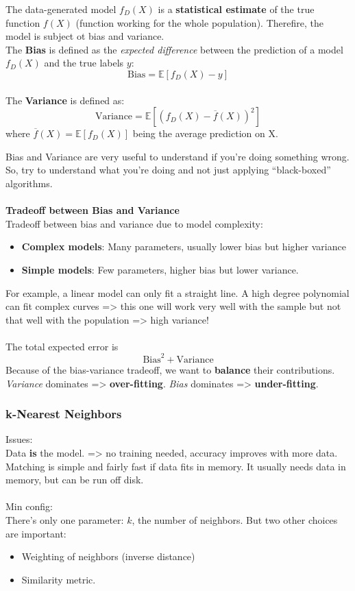 The data-generated model $f_D(X)$ is a \textbf{statistical estimate} of the true function $f(X)$ (function working for the whole population). Therefire, the model is subject ot bias and variance. 
\\
The \textbf{Bias} is defined as the \emph{expected difference} between the prediction of a model $f_D(X)$ and the true labels $y$:
\[
 \textrm{Bias} = \mathbb{E}\left[ f_D(X)-y\right]
\]
\\
The \textbf{Variance} is defined as:
\[
 \textrm{Variance} = \mathbb{E}\left[\left(f_D(X) - \overline{f}(X)\right)^2\right]
\]
where $\overline{f}(X) = \mathbb{E}\left[f_D(X)\right]$ being the average prediction on X.

Bias and Variance are very useful to understand if you're doing something wrong. So, try to understand what you're doing and not just applying ``black-boxed'' algorithms.
\\\\
\textbf{Tradeoff between Bias and Variance}
\\
Tradeoff between bias and variance due to model complexity:
\begin{itemize}
 \item \textbf{Complex models}: Many parameters, usually lower bias but higher variance
 \item \textbf{Simple models}: Few parameters, higher bias but lower variance.
\end{itemize}

For example, a linear model can only fit a straight line. A high degree polynomial can fit complex curves => this one will work very well with the sample but not that well with the population => high variance!
\\\\
The total expected error is 
\[
 \textrm{Bias}^2 + \textrm{Variance}
\]
Because of the bias-variance tradeoff, we want to \textbf{balance} their contributions. \emph{Variance} dominates => \textbf{over-fitting}. \emph{Bias} dominates => \textbf{under-fitting}.

\subsubsection{k-Nearest Neighbors}
Issues: \\
Data \textbf{is} the model. => no training needed, accuracy improves with more data. Matching is simple and fairly fast if data fits in memory. It usually needs data in memory, but can be run off disk. 
\\\\
Min config: \\
There's only one parameter: $k$, the number of neighbors. But two other choices are important:
\begin{itemize}
 \item Weighting of neighbors (inverse distance)
 \item Similarity metric.
\end{itemize}

